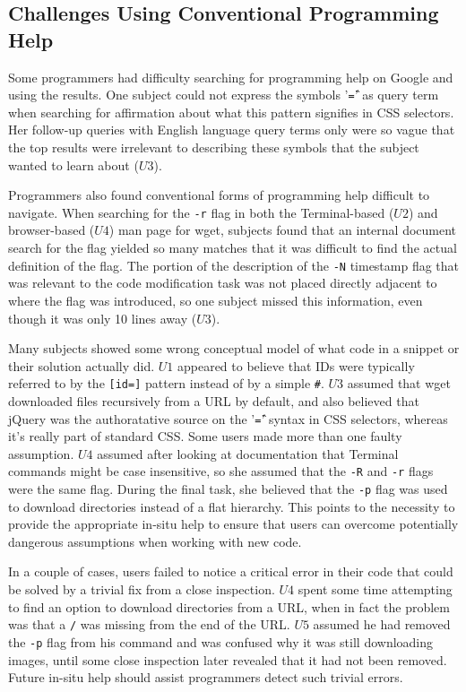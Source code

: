 \subsection{Challenges Using Conventional Programming Help}

Some programmers had difficulty searching for programming help on Google and using the results.
One subject could not express the symbols '\texttt{\^=}' as query term when searching for affirmation about what this pattern signifies in CSS selectors.
Her follow-up queries with English language query terms only were so vague that the top results were irrelevant to describing these symbols that the subject wanted to learn about ($U3$).

Programmers also found conventional forms of programming help difficult to navigate.
When searching for the \texttt{-r} flag in both the Terminal-based ($U2$) and browser-based ($U4$) man page for wget, subjects found that an internal document search for the flag yielded so many matches that it was difficult to find the actual definition of the flag.
The portion of the description of the \texttt{-N} timestamp flag that was relevant to the code modification task was not placed directly adjacent to where the flag was introduced, so one subject missed this information, even though it was only 10 lines away ($U3$).

Many subjects showed some wrong conceptual model of what code in a snippet or their solution actually did.
$U1$ appeared to believe that IDs were typically referred to by the \texttt{[id=]} pattern instead of by a simple \texttt{\#}.
$U3$ assumed that wget downloaded files recursively from a URL by default, and also believed that jQuery was the authoratative source on the '\texttt{\^=}' syntax in CSS selectors, whereas it's really part of standard CSS.
Some users made more than one faulty assumption.
$U4$ assumed after looking at documentation that Terminal commands might be case insensitive, so she assumed that the \texttt{-R} and \texttt{-r} flags were the same flag.
During the final task, she believed that the \texttt{-p} flag was used to download directories instead of a flat hierarchy.
This points to the necessity to provide the appropriate in-situ help to ensure that users can overcome potentially dangerous assumptions when working with new code.

In a couple of cases, users failed to notice a critical error in their code that could be solved by a trivial fix from a close inspection.
$U4$ spent some time attempting to find an option to download directories from a URL, when in fact the problem was that a \texttt{/} was missing from the end of the URL.
$U5$ assumed he had removed the \texttt{-p} flag from his command and was confused why it was still downloading images, until some close inspection later revealed that it had not been removed.
Future in-situ help should assist programmers detect such trivial errors.

